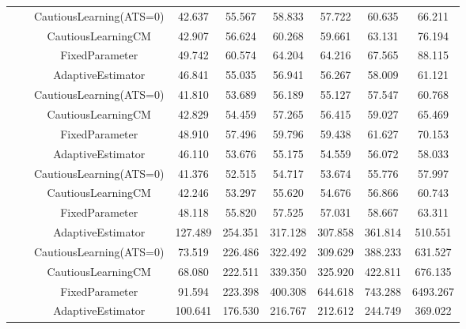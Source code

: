 \begin{table}[!h]
\begin{tabular}[t]{ccccccccc}
 &  & CautiousLearning(ATS=0) & 42.637 & 55.567 & 58.833 & 57.722 & 60.635 & 66.211\\

 &  & CautiousLearningCM & 42.907 & 56.624 & 60.268 & 59.661 & 63.131 & 76.194\\

 & \multirow[t]{-4}{*}{\centering\arraybackslash 1.00} & FixedParameter & 49.742 & 60.574 & 64.204 & 64.216 & 67.565 & 88.115\\
\cmidrule{2-9}
 &  & AdaptiveEstimator & 46.841 & 55.035 & 56.941 & 56.267 & 58.009 & 61.121\\

 &  & CautiousLearning(ATS=0) & 41.810 & 53.689 & 56.189 & 55.127 & 57.547 & 60.768\\

 &  & CautiousLearningCM & 42.829 & 54.459 & 57.265 & 56.415 & 59.027 & 65.469\\

 & \multirow[t]{-4}{*}{\centering\arraybackslash 1.25} & FixedParameter & 48.910 & 57.496 & 59.796 & 59.438 & 61.627 & 70.153\\
\cmidrule{2-9}
 &  & AdaptiveEstimator & 46.110 & 53.676 & 55.175 & 54.559 & 56.072 & 58.033\\

 &  & CautiousLearning(ATS=0) & 41.376 & 52.515 & 54.717 & 53.674 & 55.776 & 57.997\\

 &  & CautiousLearningCM & 42.246 & 53.297 & 55.620 & 54.676 & 56.866 & 60.743\\

\multirow[t]{-28}{*}{\centering\arraybackslash 50} & \multirow[t]{-4}{*}{\centering\arraybackslash 1.50} & FixedParameter & 48.118 & 55.820 & 57.525 & 57.031 & 58.667 & 63.311\\
\cmidrule{1-9}
 &  & AdaptiveEstimator & 127.489 & 254.351 & 317.128 & 307.858 & 361.814 & 510.551\\

 &  & CautiousLearning(ATS=0) & 73.519 & 226.486 & 322.492 & 309.629 & 388.233 & 631.527\\

 &  & CautiousLearningCM & 68.080 & 222.511 & 339.350 & 325.920 & 422.811 & 676.135\\

 & \multirow[t]{-4}{*}{\centering\arraybackslash 0.25} & FixedParameter & 91.594 & 223.398 & 400.308 & 644.618 & 743.288 & 6493.267\\
\cmidrule{2-9}
 &  & AdaptiveEstimator & 100.641 & 176.530 & 216.767 & 212.612 & 244.749 & 369.022\\


\end{tabular}
\end{table}
